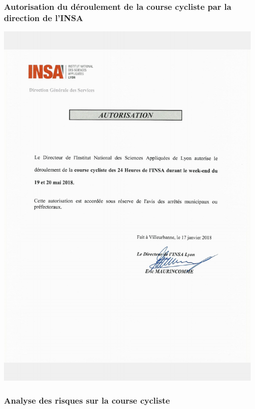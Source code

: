 \documentclass[hidelinks, paper=a4, fontsize=13pt]{report}
\begin{document}
\subsubsection{Autorisation du déroulement de la course cycliste par la direction de l’INSA}
\begin{center}
\includegraphics[scale=0.72]{Annexes/Documents/INSAAutorisationCourseCycliste}
\end{center}

\subsubsection{Analyse des risques sur la course cycliste}
\end{document}
